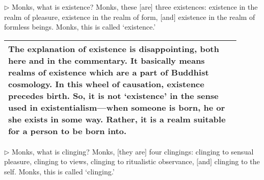 
\addtocounter{sennum}{-3}
$\triangleright$  Monks, what is existence?  Monks, these [are] three existences: existence in the realm of pleasure, existence in the realm of form, [and] existence in the realm of formless beings.  Monks, this is called `existence.'\\

\begin{longtable}[c]{|p{0.9\linewidth}|}
\hline
\hspace{5mm}\small The explanation of existence is disappointing, both here and in the commentary. It basically means realms of existence which are a part of Buddhist cosmology. In this wheel of causation, existence precedes birth. So, it is not `existence' in the sense used in existentialism---when someone is born, he or she exists in some way. Rather, it is a realm suitable for a person to be born into.\\
\hline
\end{longtable}


\addtocounter{sennum}{-3}
$\triangleright$  Monks, what is clinging?  Monks, [they are] four clingings: clinging to sensual pleasure, clinging to views, clinging to ritualistic observance, [and] clinging to the self.  Monks, this is called `clinging.'\\

